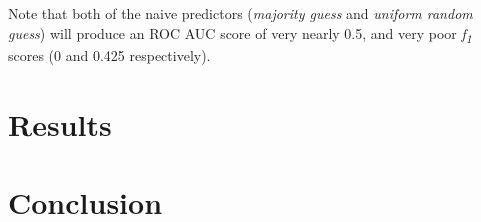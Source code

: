 \documentclass[10pt,conference]{IEEEtran}
\begin{document}
 Note that both of the naive predictors (\emph{majority guess} and \emph{uniform random guess}) will produce an ROC AUC score of very nearly 0.5, and very poor \emph{f\textsubscript{1}} scores (0 and 0.425 respectively).
\section{Results}


\section{Conclusion}

\nocite{*}




\vspace{12pt}
\end{document}
